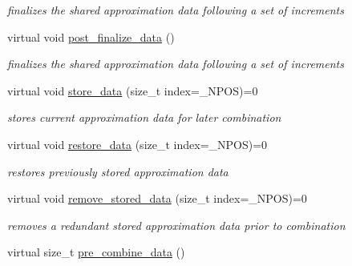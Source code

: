 \begin{DoxyCompactItemize}
\begin{DoxyCompactList}\small\item\em finalizes the shared approximation data following a set of increments \end{DoxyCompactList}\item 
virtual void \hyperlink{classPecos_1_1SharedPolyApproxData_a627c3fbb950715823e57acd6bfa0fd72}{post\+\_\+finalize\+\_\+data} ()\label{classPecos_1_1SharedPolyApproxData_a627c3fbb950715823e57acd6bfa0fd72}

\begin{DoxyCompactList}\small\item\em finalizes the shared approximation data following a set of increments \end{DoxyCompactList}\item 
virtual void \hyperlink{classPecos_1_1SharedPolyApproxData_a9a5bd0d9072d9cf3355f788247197a43}{store\+\_\+data} (size\+\_\+t index=\+\_\+\+N\+P\+OS)=0\label{classPecos_1_1SharedPolyApproxData_a9a5bd0d9072d9cf3355f788247197a43}

\begin{DoxyCompactList}\small\item\em stores current approximation data for later combination \end{DoxyCompactList}\item 
virtual void \hyperlink{classPecos_1_1SharedPolyApproxData_a704e46a3a9d03ae55f3fe4a2e8d85453}{restore\+\_\+data} (size\+\_\+t index=\+\_\+\+N\+P\+OS)=0\label{classPecos_1_1SharedPolyApproxData_a704e46a3a9d03ae55f3fe4a2e8d85453}

\begin{DoxyCompactList}\small\item\em restores previously stored approximation data \end{DoxyCompactList}\item 
virtual void \hyperlink{classPecos_1_1SharedPolyApproxData_aab37b298b6a0924d4f71e5ebc2f97bcc}{remove\+\_\+stored\+\_\+data} (size\+\_\+t index=\+\_\+\+N\+P\+OS)=0\label{classPecos_1_1SharedPolyApproxData_aab37b298b6a0924d4f71e5ebc2f97bcc}

\begin{DoxyCompactList}\small\item\em removes a redundant stored approximation data prior to combination \end{DoxyCompactList}\item 
virtual size\+\_\+t \hyperlink{classPecos_1_1SharedPolyApproxData_a9eb4d06b29a49d454be12741309d8a2b}{pre\+\_\+combine\+\_\+data} ()\label{classPecos_1_1SharedPolyApproxData_a9eb4d06b29a49d454be12741309d8a2b}


\end{DoxyCompactItemize}
